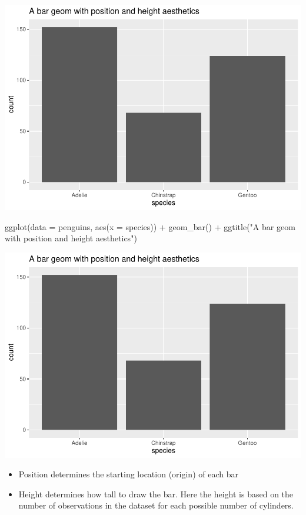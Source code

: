 \documentclass[
]{article}
\newenvironment{Shaded}{\begin{snugshade}}{\end{snugshade}}
\newcommand{\AttributeTok}[1]{\textcolor[rgb]{0.77,0.63,0.00}{#1}}
\newcommand{\FunctionTok}[1]{\textcolor[rgb]{0.00,0.00,0.00}{#1}}
\newcommand{\NormalTok}[1]{#1}
\newcommand{\SpecialCharTok}[1]{\textcolor[rgb]{0.00,0.00,0.00}{#1}}
\newcommand{\StringTok}[1]{\textcolor[rgb]{0.31,0.60,0.02}{#1}}
\providecommand{\tightlist}{%
  \setlength{\itemsep}{0pt}\setlength{\parskip}{0pt}}
\begin{document}
\includegraphics{Grammar-of-Graphics_files/figure-latex/geom_bar-1-1.pdf}

\begin{Shaded}
\begin{Highlighting}[]
\FunctionTok{ggplot}\NormalTok{(}\AttributeTok{data =}\NormalTok{ penguins, }\FunctionTok{aes}\NormalTok{(}\AttributeTok{x =}\NormalTok{ species)) }\SpecialCharTok{+}
  \FunctionTok{geom\_bar}\NormalTok{() }\SpecialCharTok{+}
  \FunctionTok{ggtitle}\NormalTok{(}\StringTok{"A bar geom with position and height aesthetics"}\NormalTok{)}
\end{Highlighting}
\end{Shaded}

\includegraphics{Grammar-of-Graphics_files/figure-latex/geom_bar-2-1.pdf}

\begin{itemize}
\tightlist
\item
  Position determines the starting location (origin) of each bar
\item
  Height determines how tall to draw the bar. Here the height is based
  on the number of observations in the dataset for each possible number
  of cylinders.
\end{itemize}
\end{document}
